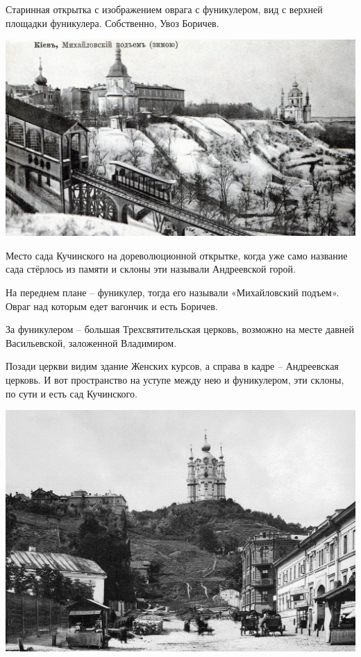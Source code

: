 \documentclass[a5paper,11pt,openany]{article}
\begin{document}
Старинная открытка с изображением оврага с фуникулером, вид с верхней площадки фуникулера. Собственно, Увоз Боричев.

\vspace*{\fill}

\newpage

\vspace*{\fill}

\begin{center}
\includegraphics[width=\linewidth]{kuch01.jpg}
\end{center}

Место сада Кучинского на дореволюционной открытке, когда уже само название сада стёрлось из памяти и склоны эти называли Андреевской горой.

На переднем плане – фуникулер, тогда его называли «Михайловский подъем». Овраг над которым едет вагончик и есть Боричев.

За фуникулером – большая Трехсвятительская церковь, возможно на месте давней Васильевской, заложенной Владимиром.

Позади церкви видим здание Женских курсов, а справа в кадре – Андреевская церковь. И вот пространство на уступе между нею и фуникулером, эти склоны, по сути и есть сад Кучинского.

\vspace*{\fill}

\newpage

\vspace*{\fill}

\begin{center}
\includegraphics[width=\linewidth]{kuch02.jpg}
\end{center}
\end{document}
